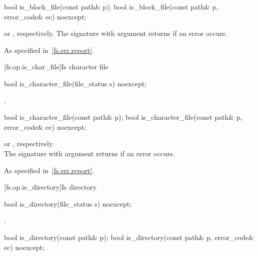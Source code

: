%
\begin{itemdecl}
bool is_block_file(const path& p);
bool is_block_file(const path& p, error_code& ec) noexcept;
\end{itemdecl}

\begin{itemdescr}
\pnum
\returns {} or , respectively.
The signature with argument  returns  if an error occurs.

\pnum
\throws As specified in~\ref{fs.err.report}.
\end{itemdescr}


[fs.op.is_char_file]{Is character file}

%
\begin{itemdecl}
bool is_character_file(file_status s) noexcept;
\end{itemdecl}

\begin{itemdescr}
\pnum
\returns {}.
\end{itemdescr}

%
\begin{itemdecl}
bool is_character_file(const path& p);
bool is_character_file(const path& p, error_code& ec) noexcept;
\end{itemdecl}

\begin{itemdescr}
\pnum
\returns {}
  or ,
  respectively.\\The signature with argument  returns 
  if an error occurs.

\pnum
\throws As specified in~\ref{fs.err.report}.
\end{itemdescr}


[fs.op.is_directory]{Is directory}

%
\begin{itemdecl}
bool is_directory(file_status s) noexcept;
\end{itemdecl}

\begin{itemdescr}
\pnum
\returns {}.
\end{itemdescr}

%
\begin{itemdecl}
bool is_directory(const path& p);
bool is_directory(const path& p, error_code& ec) noexcept;
\end{itemdecl}

